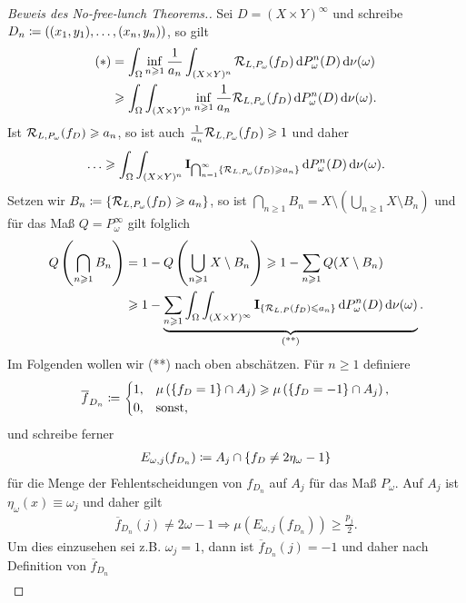 \begin{proof}[Beweis des No-free-lunch Theorems.]
Sei $D=(X\times Y)^\infty$ und schreibe $D_n \coloneq ((x_1,y_1),\ldots,(x_n,y_n))$,
so gilt
\begin{align*}
(*) &= \int_\Omega \inf_{n\geqslant 1} \frac{1}{a_n} \int_{(X\times Y)^n}
\mathcal{R}_{L,P_\omega}(f_D) \,\mathrm{d} P_\omega^n(D) \,\mathrm{d} \nu(\omega)\\
&\geqslant
\int_\Omega \int_{(X\times Y)^n} \inf_{n\geqslant 1} \frac{1}{a_n} 
\mathcal{R}_{L,P_\omega}(f_D) \,\mathrm{d} P_\omega^n(D) \,\mathrm{d} \nu(\omega).
\end{align*}
Ist $\mathcal{R}_{L,P_\omega}(f_{D}) \geqslant a_n$, so ist auch
$\frac{1}{a_n}\mathcal{R}_{L,P_\omega}(f_D)\geqslant 1$ und daher
\begin{align*}
\ldots \geqslant
\int_\Omega \int_{(X\times Y)^n} \mathbf{I}_{\bigcap_{n=1}^\infty
\left\{ \mathcal{R}_{L,P_\omega}(f_D) \geqslant a_n \right\}}
\,\mathrm{d} P_\omega^n(D) \,\mathrm{d} \nu(\omega).
\end{align*}
Setzen wir $B_n\coloneq\left\{ \mathcal{R}_{L,P_\omega}(f_D) \geqslant a_n \right\}$, so ist $\bigcap_{n\ge
1} B_n = X\setminus \left(\bigcup_{n\ge 1} X\setminus B_n\right)$ und für das
Maß $Q=P_\omega^\infty$ gilt folglich
\begin{align*}
Q\left(\bigcap_{n\geqslant 1} B_n\right) &= 1-Q\left(\bigcup_{n\geqslant 1} X\setminus
B_n\right) \geqslant 1-\sum_{n\geqslant 1} Q(X\setminus B_n)\\
&\geqslant 
1- \underbrace{\sum_{n\geqslant 1} \int_\Omega \int_{(X\times Y)^\infty}
\mathbf{I}_{\left\{ \mathcal{R}_{L,P}(f_D)\leqslant a_n \right\}} \,\mathrm{d} P_\omega^n(D)\,\mathrm{d} \nu(\omega)}_{\text{(**)}}.
\end{align*}
Im Folgenden wollen wir (**) nach oben abschätzen. Für $n\ge 1$ definiere
\begin{align*}
\overline{f}_{D_n} \coloneq
\begin{cases}
1, & \mu\left(\left\{ f_D=1 \right\} \cap A_j \right) \geqslant \mu\left(\left\{ f_D = -1 \right\}\cap A_j
\right),\\
0, & \text{sonst},
\end{cases}
\end{align*}
und schreibe ferner
\begin{align*}
E_{\omega,j}(f_{D_n}) \coloneq
A_j \cap \left\{ f_D \neq 2\eta_\omega -1 \right\}
\end{align*}
für die Menge der Fehlentscheidungen von $f_{D_n}$ auf $A_j$ für das Maß
$P_\omega$. Auf $A_j$ ist $\eta_\omega(x)\equiv \omega_j$ und daher gilt
\begin{align*}
\overline{f}_{D_n}(j) \neq 2\omega -1 \Rightarrow
\mu(E_{\omega,j}(f_{D_n})) \ge \frac{p_j}{2}.
\end{align*}
Um dies einzusehen sei z.B. $\omega_j = 1$, dann ist
$\overline{f}_{D_n}(j)=-1$ und daher nach Definition von $\overline{f}_{D_n}$
\begin{align*}

\end{align*}
\end{proof}
